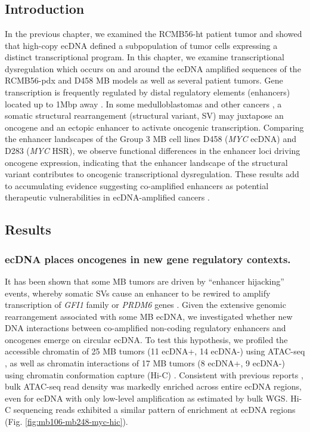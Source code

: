 \chapter{\epigeneticstitle}
\label{chap:epigenomics}
\glsresetall
\clearpage

\section{Introduction}

In the previous chapter, we examined the RCMB56-ht patient tumor and showed that high-copy ecDNA defined a subpopulation of tumor cells expressing a distinct transcriptional program. In this chapter, we examine transcriptional dysregulation which occurs on and around the ecDNA amplified sequences of the RCMB56-pdx and D458 \gls{MB} models as well as several patient tumors. Gene transcription is frequently regulated by distal regulatory elements (enhancers) located up to 1Mbp away \cite{pennacchio_2013}. In some medulloblastomas \cite{northcott_2014} and other cancers \cite{neoloopfinder}, a somatic structural rearrangement (structural variant, SV) may juxtapose an oncogene and an ectopic enhancer to activate oncogenic transcription. Comparing the enhancer landscapes of the Group 3 MB cell lines D458 (\textit{MYC} ecDNA) and D283 (\textit{MYC} \acrshort{HSR}), we observe functional differences in the enhancer loci driving oncogene expression, indicating that the enhancer landscape of the structural variant contributes to oncogenic transcriptional dysregulation. These results add to accumulating evidence suggesting co-amplified enhancers as potential therapeutic vulnerabilities in ecDNA-amplified cancers \cite{hung_2021}.

\section{Results}

\subsection{ecDNA places oncogenes in new gene regulatory contexts.}
It has been shown that some MB tumors are driven by ``enhancer hijacking'' events, whereby somatic SVs cause an enhancer to be rewired to amplify transcription of \textit{GFI1} family or \textit{PRDM6} genes \cite{northcott_2012,Northcott_2017}. Given the extensive genomic rearrangement associated with some MB ecDNA, we investigated whether new DNA interactions between co-amplified non-coding regulatory enhancers and oncogenes emerge on circular ecDNA. To test this hypothesis, we profiled the accessible chromatin of 25 MB tumors (11 ecDNA+, 14 ecDNA-) using ATAC-seq \cite{atac-seq}, as well as chromatin interactions of 17 MB tumors (8 ecDNA+, 9 ecDNA-) using chromatin conformation capture (Hi-C) \cite{rao_2014}. Consistent with previous reports \cite{Wu_2019,kumar_2020}, bulk ATAC-seq read density was markedly enriched across entire ecDNA regions, even for ecDNA with only low-level amplification as estimated by bulk WGS. Hi-C sequencing reads exhibited a similar pattern of enrichment at ecDNA regions (Fig. \ref{fig:mb106-mb248-myc-hic}). 

